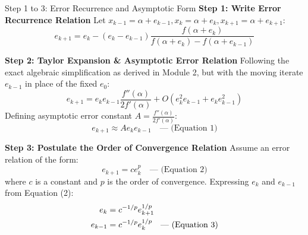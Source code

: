 \documentclass[11pt,a4paper]{article}
\begin{document}
\begin{exbox}{Step 1 to 3: Error Recurrence and Asymptotic Form}
\textbf{Step 1: Write Error Recurrence Relation}
Let $x_{k-1} = \alpha + e_{k-1}, x_k = \alpha + e_k, x_{k+1} = \alpha + e_{k+1}$:
\begin{equation}
    e_{k+1} = e_k - (e_k - e_{k-1}) \frac{f(\alpha + e_k)}{f(\alpha + e_k) - f(\alpha + e_{k-1})}
\end{equation}

\textbf{Step 2: Taylor Expansion \& Asymptotic Error Relation}
Following the exact algebraic simplification as derived in Module 2, but with the moving iterate $e_{k-1}$ in place of the fixed $e_0$:
\begin{equation}
    e_{k+1} = e_k e_{k-1} \frac{f''(\alpha)}{2 f'(\alpha)} + O(e_k^2 e_{k-1} + e_k e_{k-1}^2)
\end{equation}
Defining asymptotic error constant $A = \frac{f''(\alpha)}{2 f'(\alpha)}$:
\begin{equation}
    e_{k+1} \approx A e_k e_{k-1} \quad \text{--- (Equation 1)}
\end{equation}

\textbf{Step 3: Postulate the Order of Convergence Relation}
Assume an error relation of the form:
\begin{equation}
    e_{k+1} = c e_k^p \quad \text{--- (Equation 2)}
\end{equation}
where $c$ is a constant and $p$ is the order of convergence.
Expressing $e_k$ and $e_{k-1}$ from Equation (2):
\begin{align}
    e_k &= c^{-1/p} e_{k+1}^{1/p} \notag \\
    e_{k-1} &= c^{-1/p} e_k^{1/p} \quad \text{--- (Equation 3)}
\end{align}
\end{exbox}
\end{document}

